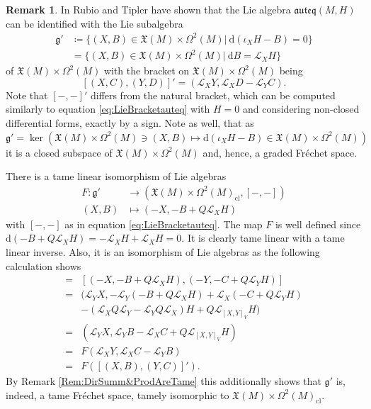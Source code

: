 \documentclass[12pt,a4paper]{article}
\theoremstyle{plain}
\theoremstyle{definition}
\newtheorem{remark}[theorem]{Remark}
\newcommand{\VFs}{\mathfrak{X}(M)}
\newcommand{\Forms}[1]{\Omega^{#1}(M)}
\newcommand{\ClForms}[1]{\Forms{#1}_{\mathrm{cl}}}
\newcommand{\LieD}{\mathcal{L}}
\newcommand{\auteq}{\mathfrak{auteq}(M,H)}
\newcommand{\gfrak}{\mathfrak{g}}
\renewcommand{\d}{\mathrm{d}}
\begin{document}
\begin{remark}
In \cite[Theorem 3.8]{RubioTipler} Rubio and Tipler have shown that the Lie algebra $\auteq$ can be identified with the Lie subalgebra 
\begin{align*}
    \gfrak'&\coloneqq\{(X,B)\in \VFs\times \Forms{2}|~\d(\iota_XH-B)=0\}\\
    &=\{(X,B)\in \VFs\times \Forms{2}|~\d B=\LieD_XH\}
\end{align*}
of $\VFs\times \Forms{2}$ with the bracket on $\VFs\times \Forms{2}$ being $$[(X,C),(Y,D)]'=(\LieD_XY,\LieD_XD-\LieD_YC).$$
Note that $[-,-]'$ differs from the natural bracket, which can be computed similarly to equation \eqref{eq:LieBracketauteq} with $H=0$ and considering non-closed differential forms, exactly by a sign.
Note as well, that as $\gfrak'=\ker(\VFs\times \Forms{2}\ni (X,B)\mapsto \d(\iota_XH-B)\in \VFs\times \Forms{2})$ it is a closed subspace of $\VFs\times \Forms{2}$ and, hence, a graded Fréchet space.

There is a tame linear isomorphism of Lie algebras 
\begin{align*}
    F:\gfrak'&\longrightarrow (\VFs\times \ClForms{2},[-,-])\\
    (X,B)&\longmapsto (-X,-B+Q\LieD_XH)
\end{align*}
with $[-,-]$ as in equation \eqref{eq:LieBracketauteq}.
The map $F$ is well defined since
$\d(-B+Q\LieD_XH)=-\LieD_XH+\LieD_XH=0$. It is clearly tame linear with a tame linear inverse. Also, it is an isomorphism of Lie algebras as the following calculation shows
\begin{align*}
    [F(X,B),F(Y,C)]=&[(-X,-B+Q\LieD_XH),(-Y,-C+Q\LieD_YH)]\\
    =&(\LieD_YX,-\LieD_Y(-B+Q\LieD_XH)+\LieD_X(-C+Q\LieD_YH)\\
    &-(\LieD_XQ\LieD_Y-\LieD_YQ\LieD_X)H+Q\LieD_{[X,Y]_V}H)\\
    =&(\LieD_YX,\LieD_YB-\LieD_XC+Q\LieD_{[X,Y]_V}H)\\
    =&F(\LieD_XY,\LieD_XC-\LieD_YB)\\
    =&F([(X,B),(Y,C)]').
\end{align*}
By Remark \ref{Rem:DirSumm&ProdAreTame} this additionally shows that $\gfrak'$ is, indeed, a tame Fréchet space, tamely isomorphic to $\VFs\times \ClForms{2}$.
\end{remark}
\end{document}
